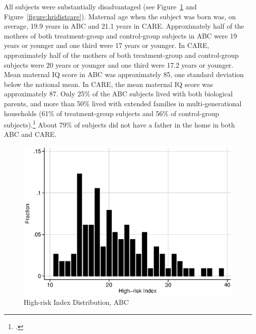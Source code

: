 \noindent All subjects were substantially disadvantaged (see Figure~\ref{figure:hridistabc} and Figure~\ref{figure:hridistcare}). Maternal age when the subject was born was, on average, 19.9 years in ABC and 21.1 years in CARE. Approximately half of the mothers of both treatment-group and control-group subjects in ABC were 19 years or younger and one third were 17 years or younger. In CARE, approximately half of the mothers of both treatment-group and control-group subjects were 20 years or younger and one third were 17.2 years or younger.  Mean maternal IQ score in ABC was approximately 85, one standard deviation below the national mean. In CARE, the mean maternal IQ score was approximately 87. Only 25\% of the ABC subjects lived with both biological parents, and more than 50\% lived with extended families in multi-generational households (61\% of treatment-group subjects and 56\% of control-group subjects).\footnote{\citet{Ramey_Campbell_1991_childreninpoverty,Campbell_Ramey_1994_CD}.} About 79\% of subjects did not have a father in the home in both ABC and CARE. \\

\begin{center}
	\begin{figure}[H]
		\caption{High-risk Index Distribution, ABC} \label{figure:hridistabc}
		\centering
		\includegraphics[width=.9\columnwidth]{output/abc_hri.eps}
	\end{figure}
\end{center}

